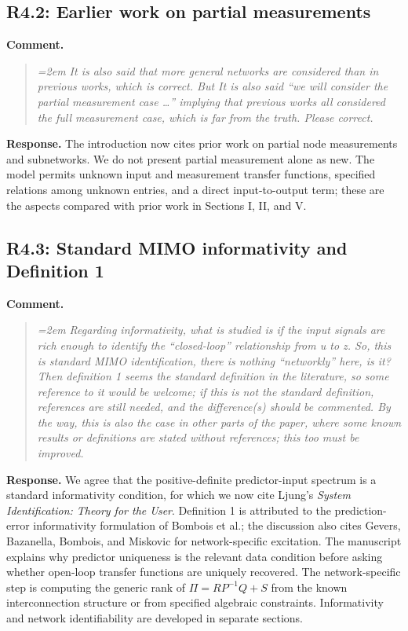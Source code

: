 \documentclass[11pt]{article}
\begin{document}
\subsection*{R4.2: Earlier work on partial measurements}
\textbf{Comment.}
\begin{quote}\itshape\emergencystretch=2em
It is also said that more general networks are considered than in previous works, which is correct. But It is also said ``we will consider the partial measurement case \ldots{}'' implying that previous works all considered the full measurement case, which is far from the truth. Please correct.
\end{quote}

\textbf{Response.} The introduction now cites prior work on partial node
measurements and subnetworks. We do not present partial measurement alone
as new. The model permits unknown input and measurement transfer
functions, specified relations among unknown entries, and a direct
input-to-output term; these are the aspects compared with prior work in
Sections I, II, and V.

\subsection*{R4.3: Standard MIMO informativity and Definition 1}
\textbf{Comment.}
\begin{quote}\itshape\emergencystretch=2em
Regarding informativity, what is studied is if the input signals are rich enough to identify the ``closed-loop'' relationship from u to z. So, this is standard MIMO identification, there is nothing ``networkly'' here, is it? Then definition 1 seems the standard definition in the literature, so some reference to it would be welcome; if this is not the standard definition, references are still needed, and the difference(s) should be commented. By the way, this is also the case in other parts of the paper, where some known results or definitions are stated without references; this too must be improved.
\end{quote}

\textbf{Response.} We agree that the positive-definite predictor-input
spectrum is a standard informativity condition, for which we now cite
Ljung's \emph{System Identification: Theory for the User}. Definition 1 is
attributed to the prediction-error informativity formulation of Bombois
et al.; the discussion also cites Gevers, Bazanella, Bombois, and
Miskovic for network-specific excitation. The manuscript explains why predictor uniqueness is the
relevant data condition before asking whether open-loop transfer functions are uniquely
recovered. The network-specific step is computing the generic rank of
$\Pi=RP^{-1}Q+S$ from the known interconnection structure or from
specified algebraic constraints. Informativity and network
identifiability are developed in separate sections.
\end{document}

